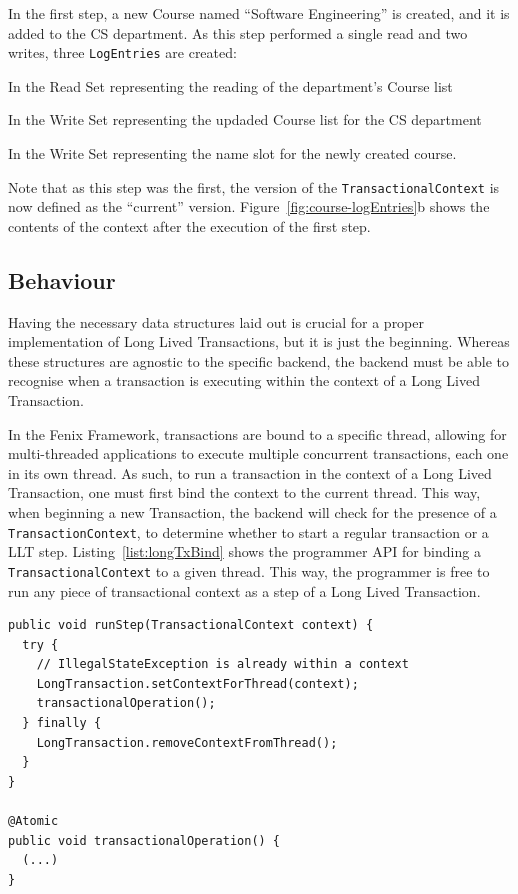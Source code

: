 In the first step, a new Course named ``Software Engineering'' is
created, and it is added to the CS department. As this step performed
a single read and two writes, three \texttt{LogEntries} are created: 
\begin{inparaenum}
\item In the Read Set representing the reading of the department's
  Course list
\item In the Write Set representing the updaded Course list for the CS
  department
\item In the Write Set representing the name slot for the newly
  created course.
\end{inparaenum}
Note that as this step was the first, the version of the
\texttt{TransactionalContext} is now defined as the ``current''
version. Figure~\ref{fig:course-logEntries}b shows the contents of the
context after the execution of the first step.

\subsection{Behaviour}

Having the necessary data structures laid out is crucial for a proper
implementation of Long Lived Transactions, but it is just the
beginning. Whereas these structures are agnostic to the specific
backend, the backend must be able to recognise when a transaction is
executing within the context of a Long Lived Transaction.

In the Fenix Framework, transactions are bound to a specific thread,
allowing for multi-threaded applications to execute multiple
concurrent transactions, each one in its own thread. As such, to run a
transaction in the context of a Long Lived Transaction, one must first
bind the context to the current thread. This way, when beginning a new
Transaction, the backend will check for the presence of a
\texttt{TransactionContext}, to determine whether to start a regular
transaction or a LLT step. Listing~\ref{list:longTxBind} shows the
programmer API for binding a \texttt{TransactionalContext} to a given
thread. This way, the programmer is free to run any piece of
transactional context as a step of a Long Lived Transaction.

\begin{lstlisting}[caption={Example of TransactionalContext usage},
  label={list:longTxBind},float]
public void runStep(TransactionalContext context) {
  try {
    // IllegalStateException is already within a context
    LongTransaction.setContextForThread(context);
    transactionalOperation();
  } finally {
    LongTransaction.removeContextFromThread();
  }
}

@Atomic
public void transactionalOperation() {
  (...)
}
\end{lstlisting}

